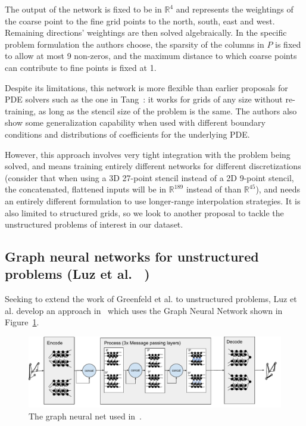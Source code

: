 \documentclass{svproc}
\newcommand{\etal}{et al. }
\begin{document}
The output of the network is fixed to be in $\mathbb{R}^4$ and represents the weightings of the coarse point to the fine grid points to the north, south, east and west. Remaining directions' weightings are then solved algebraically. In the specific problem formulation the authors choose, the sparsity of the columns in $P$ is fixed to allow at most 9 non-zeros, and the maximum distance to which coarse points can contribute to fine points is fixed at 1.

Despite its limitations, this network is more flexible than earlier proposals for PDE solvers such as the one in Tang~\cite{Tang2017}: it works for grids of any size without re-training, as long as the stencil size of the problem is the same. The authors also show some generalization capability when used with different boundary conditions and distributions of coefficients for the underlying PDE. 

However, this approach involves very tight integration with the problem being solved, and means training entirely different networks for different discretizations (consider that when using a 3D 27-point stencil instead of a 2D 9-point stencil, the concatenated, flattened inputs will be in $\mathbb{R}^{189}$ instead of than $\mathbb{R}^{45}$), and needs an entirely different formulation to use longer-range interpolation strategies. It is also limited to structured grids, so we look to another proposal to tackle the unstructured problems of interest in our dataset.


\subsection{Graph neural networks for unstructured problems (Luz \etal~\cite{Luz2020})}
\label{sec:luz}
Seeking to extend the work of Greenfeld \etal to unstructured problems, Luz \etal develop an approach in~\cite{Luz2020} which uses the Graph Neural Network shown in Figure~\ref{fig:gnn}. 

\begin{figure}
    \centering
    \includegraphics[width=\linewidth]{images/GraphNeuralNet.pdf}
    \caption{The graph neural net used in~\cite{Luz2020}.}
    \label{fig:gnn}
\end{figure}
\end{document}
